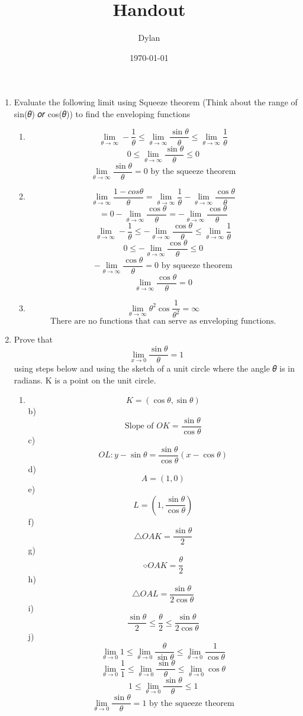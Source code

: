 \documentclass[letterpaper]{article}
\author{Dylan}
\date{\today}
\title{Handout}
\renewcommand\maketitle{}
\begin{document}
\maketitle
\begin{enumerate}
\item Evaluate the following limit using Squeeze theorem (Think about the
range of sin(𝜃) 𝑜𝑟 cos(𝜃)) to find the enveloping functions

\begin{enumerate}
\item \[\lim\limits_{\theta \to \infty}-\frac{1}{\theta}\leq\lim\limits_{\theta \to \infty}\frac{\sin{\theta}}{\theta}\leq\lim\limits_{\theta \to \infty}\frac{1}{\theta}\]\[0\leq\lim\limits_{\theta \to \infty}\frac{\sin{\theta}}{\theta}\leq0\]\[\lim\limits_{\theta \to \infty}\frac{\sin{\theta}}{\theta} = 0 \text{ by the squeeze theorem}\]
\item \[\lim\limits_{\theta \to \infty}\frac{1-cos{\theta}}{\theta}=\lim\limits_{\theta \to \infty}\frac{1}{\theta}-\lim\limits_{\theta \to \infty}\frac{\cos{\theta}}{\theta}\]\[=0-\lim\limits_{\theta \to \infty}\frac{\cos{\theta}}{\theta}
       =-\lim\limits_{\theta \to \infty}\frac{\cos{\theta}}{\theta}\]\[\lim\limits_{\theta \to \infty}-\frac{1}{\theta}\leq-\lim\limits_{\theta \to \infty}\frac{\cos{\theta}}{\theta}\leq\lim\limits_{\theta \to \infty}\frac{1}{\theta}\]\[0\leq-\lim\limits_{\theta \to \infty}\frac{\cos{\theta}}{\theta}\leq0\]\[-\lim\limits_{\theta \to \infty}\frac{\cos{\theta}}{\theta}=0 \text{ by squeeze theorem}\]\[\lim\limits_{\theta \to \infty}\frac{\cos{\theta}}{\theta}=0\]
\item \[\lim\limits_{\theta \to \infty}\theta^2\cos{\frac{1}{\theta^2}} = \infty\]\[\text{There are no functions that can serve as enveloping functions.}\]
\end{enumerate}

\item Prove that\[\lim\limits_{x\to0}\frac{\sin{\theta}}{\theta} = 1\]
using steps below and using the sketch of a unit circle where the
angle 𝜃 is in radians. K is a point on the unit circle.

\begin{enumerate}
\item \[K = (\cos{\theta}, \sin{\theta})\]b)
\[\text{Slope of }OK = \frac{\sin{\theta}}{\cos{\theta}}\]c)
\[OL: y-\sin{\theta}=\frac{\sin{\theta}}{\cos{\theta}}(x-\cos{\theta})\]d)
\[A=(1, 0)\]e) \[L=(1, \frac{\sin{\theta}}{\cos{\theta}})\]f)
\[\triangle OAK=\frac{\sin{\theta}}{2}\]g)
\[\text{⌔} OAK=\frac{\theta}{2}\]h)
\[\triangle OAL=\frac{\sin\theta}{2\cos\theta}\]i)
\[\frac{\sin{\theta}}{2}\leq\frac{\theta}{2}\leq\frac{\sin{\theta}}{2\cos{\theta}}\]j)
\[\lim_{\theta\to0}1\leq\lim_{\theta\to0}\frac{\theta}{\sin{\theta}}\leq\lim_{\theta\to0}\frac{1}{\cos{\theta}}\]\[\lim_{\theta\to0}\frac{1}{1}\leq\lim_{\theta\to0}\frac{\sin{\theta}}{\theta}\leq\lim_{\theta\to0}\cos{\theta}\]\[1\leq\lim_{\theta\to0}\frac{\sin{\theta}}{\theta}\leq1\]\[\lim_{\theta\to0}\frac{\sin{\theta}}{\theta}=1\text{ by the squeeze theorem}\]
\end{enumerate}
\end{enumerate}
\end{document}
